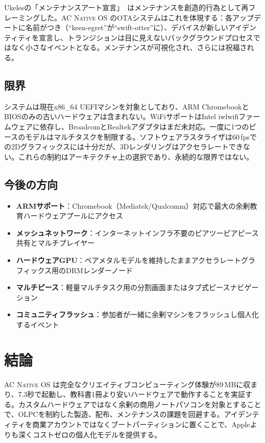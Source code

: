 \documentclass[10pt,letterpaper,twocolumn]{article}
\newcommand{\acos}{\textsc{AC Native OS}}
\begin{document}
Ukelesの「メンテナンスアート宣言」~\citep{ukeles1969manifesto}はメンテナンスを創造的行為として再フレーミングした。\acos{} のOTAシステムはこれを体現する：各アップデートに名前がつき（``keen-egret''が``swift-otter''に）、デバイスが新しいアイデンティティを宣言し、トランジションは目に見えないバックグラウンドプロセスではなく小さなイベントとなる。メンテナンスが可視化され、さらには祝福される。

\subsection{限界}

システムは現在x86\_64 UEFIマシンを対象としており、ARM ChromebookとBIOSのみの古いハードウェアは含まれない。WiFiサポートはIntel iwlwifiファームウェアに依存し、BroadcomとRealtekアダプタはまだ未対応。一度に1つのピースのモデルはマルチタスクを制限する。ソフトウェアラスタライザは60\,fpsでの2Dグラフィックスには十分だが、3Dレンダリングはアクセラレートできない。これらの制約はアーキテクチャ上の選択であり、永続的な限界ではない。

\subsection{今後の方向}

\begin{itemize}
  \item \textbf{ARMサポート}：Chromebook（Mediatek/Qualcomm）対応で最大の余剰教育ハードウェアプールにアクセス
  \item \textbf{メッシュネットワーク}：インターネットインフラ不要のピアツーピアピース共有とマルチプレイヤー
  \item \textbf{ハードウェアGPU}：ベアメタルモデルを維持したままアクセラレートグラフィックス用のDRMレンダーノード
  \item \textbf{マルチピース}：軽量マルチタスク用の分割画面またはタブ式ピースナビゲーション
  \item \textbf{コミュニティフラッシュ}：参加者が一緒に余剰マシンをフラッシュし個人化するイベント
\end{itemize}


\section{結論}

\acos{} は完全なクリエイティブコンピューティング体験が89\,MBに収まり、7.3秒で起動し、教科書1冊より安いハードウェアで動作することを実証する。カスタムハードウェアではなく余剰の商用ノートパソコンを対象とすることで、OLPCを制約した製造、配布、メンテナンスの課題を回避する。アイデンティティを商業アカウントではなくブートパーティションに置くことで、Appleよりも深くコストゼロの個人化モデルを提供する。
\end{document}
